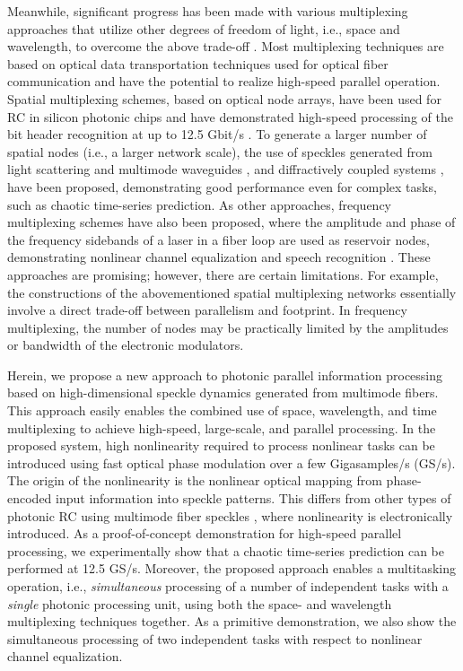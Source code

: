 \documentclass{article}
\begin{document}
Meanwhile, significant progress has been made with various
multiplexing approaches that utilize other degrees of freedom of light, i.e.,
space and wavelength, to overcome the above trade-off \cite{Vandoorne2014,Sunada2019,Laporte2018,Dong2020,Paudel2020,Bueno2018,Akrout2016}. 
%
Most multiplexing techniques are based on optical
data transportation techniques used for optical fiber communication 
and have the potential to realize high-speed parallel operation.   
%
Spatial multiplexing schemes, based on optical node arrays, have been
used for RC in silicon photonic chips and have demonstrated high-speed
processing of the bit header recognition at up to 12.5 Gbit/s
\cite{Vandoorne2014}. 
%
To generate a larger number of spatial nodes (i.e., a larger network
scale), 
the use of speckles generated
from light scattering \cite{Dong2020} and multimode waveguides
\cite{Paudel2020}, and diffractively coupled systems \cite{Bueno2018},
 have been proposed, demonstrating good performance 
even for complex tasks, such as chaotic time-series prediction. 
%
As other approaches, frequency multiplexing schemes have also
been proposed, where the amplitude and phase of the frequency sidebands of a
laser in a fiber loop are used as reservoir nodes, 
demonstrating nonlinear channel equalization and speech recognition
\cite{Akrout2016}. 
%
These approaches are promising; however, there are certain limitations.
%
For example, the constructions of the abovementioned spatial multiplexing networks
essentially involve a direct
trade-off between parallelism and footprint.  
%
In frequency multiplexing, the number of nodes may be practically
limited by the amplitudes or bandwidth of the electronic modulators.  
%

Herein, we propose a new approach to photonic parallel information
processing based on high-dimensional speckle dynamics generated from multimode fibers.
%
This approach easily enables the combined use of space, wavelength,
 and time multiplexing to achieve high-speed, large-scale, and parallel processing. 
%
In the proposed system, 
high nonlinearity required to process nonlinear tasks can be introduced 
using fast optical phase modulation over a few Gigasamples/s (GS/s). 
%
The origin of the nonlinearity is the nonlinear optical mapping 
from phase-encoded input information into speckle patterns.
%
This differs from other types of photonic RC using multimode fiber
   speckles \cite{Paudel2020}, where nonlinearity is electronically introduced.
%
As a proof-of-concept demonstration for high-speed parallel processing, 
we experimentally show that a chaotic time-series prediction
can be performed at 12.5 GS/s.
%
Moreover, the proposed approach enables
a multitasking operation, i.e., {\it simultaneous} processing of a
number of independent tasks with a {\it single} photonic processing unit, 
using both the space- and wavelength multiplexing
techniques together.
%
As a primitive demonstration, we also show the simultaneous processing of two
independent tasks with respect to nonlinear channel equalization.
 
\end{document}
